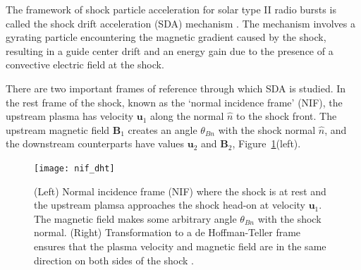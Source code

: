 The framework of shock particle acceleration for solar type II radio bursts is called the shock drift acceleration (SDA) mechanism \citep{holman1983}. The mechanism involves a gyrating particle encountering the magnetic gradient caused by the shock, resulting in a guide center drift and an energy gain due to the presence of a convective electric field at the shock. 

There are two important frames of reference through which SDA is studied. In the rest frame of the shock, known as the \textquoteleft normal incidence frame' (NIF), the upstream plasma has velocity $\mathbf{u}_1$ along the normal $\hat{n}$ to the shock front. The upstream magnetic field $\mathbf{B}_1$ creates an angle $\theta_{Bn}$ with the shock normal $\hat{n}$, and the downstream counterparts have values $\mathbf{u}_2$ and $\mathbf{B}_2$, Figure~\ref{fig:nif_dht}(left). 

\begin{figure}[!t] 
\begin{center}
\texttt{[image: nif\_dht]}
\caption[Normal incidence and de Hoffman-Teller reference frames]{(Left) Normal incidence frame (NIF) where the shock is at rest and the upstream plamsa approaches the shock head-on at velocity $\mathbf{u}_1$. The magnetic field makes some arbitrary angle $\theta_{Bn}$ with the shock normal. (Right) Transformation to a de Hoffman-Teller frame ensures that the plasma velocity and magnetic field are in the same direction on both sides of the shock \citep{ball2001}.}
\label{fig:nif_dht}
\end{center}
\end{figure}

